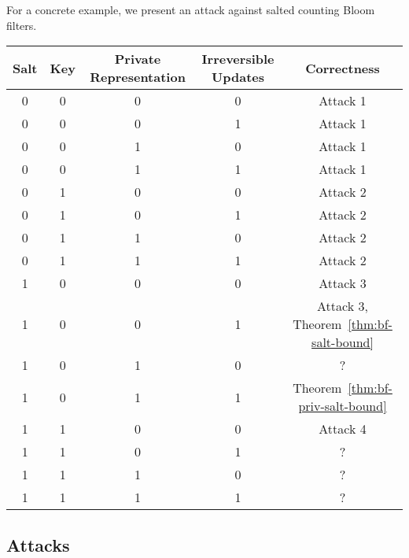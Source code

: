 For a concrete example, we present an attack against salted counting Bloom filters.

\begin{center}
  \begin{tabular}{ | c | c | c | c | c | }
    \hline
    Salt & Key & Private Representation & Irreversible Updates & Correctness \\ \hline
    0 & 0 & 0 & 0 & Attack 1 \\ \hline
    0 & 0 & 0 & 1 & Attack 1 \\ \hline
    0 & 0 & 1 & 0 & Attack 1 \\ \hline
    0 & 0 & 1 & 1 & Attack 1 \\ \hline
    0 & 1 & 0 & 0 & Attack 2 \\ \hline
    0 & 1 & 0 & 1 & Attack 2 \\ \hline
    0 & 1 & 1 & 0 & Attack 2 \\ \hline
    0 & 1 & 1 & 1 & Attack 2 \\ \hline
    1 & 0 & 0 & 0 & Attack 3 \\ \hline
    1 & 0 & 0 & 1 & Attack 3, Theorem~\ref{thm:bf-salt-bound} \\ \hline
    1 & 0 & 1 & 0 & ? \\ \hline
    1 & 0 & 1 & 1 & Theorem~\ref{thm:bf-priv-salt-bound} \\ \hline
    1 & 1 & 0 & 0 & Attack 4 \\ \hline
    1 & 1 & 0 & 1 & ? \\ \hline
    1 & 1 & 1 & 0 & ? \\ \hline
    1 & 1 & 1 & 1 & ? \\
    \hline
  \end{tabular}
\end{center}

\subsection{Attacks}

